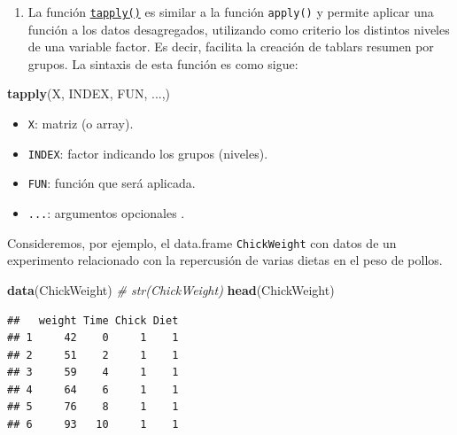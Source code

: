 \documentclass[
]{book}
\newenvironment{Shaded}{\begin{snugshade}}{\end{snugshade}}
\newcommand{\CommentTok}[1]{\textcolor[rgb]{0.56,0.35,0.01}{\textit{#1}}}
\newcommand{\FunctionTok}[1]{\textcolor[rgb]{0.13,0.29,0.53}{\textbf{#1}}}
\newcommand{\NormalTok}[1]{#1}
\newcommand{\OtherTok}[1]{\textcolor[rgb]{0.56,0.35,0.01}{#1}}
\newcommand{\SpecialCharTok}[1]{\textcolor[rgb]{0.81,0.36,0.00}{\textbf{#1}}}
\newcommand{\StringTok}[1]{\textcolor[rgb]{0.31,0.60,0.02}{#1}}
\providecommand{\tightlist}{%
  \setlength{\itemsep}{0pt}\setlength{\parskip}{0pt}}
\begin{document}
\begin{enumerate}
\def\labelenumi{\alph{enumi}.}
\setcounter{enumi}{2}
\tightlist
\item
  La función \href{https://www.rdocumentation.org/packages/base/versions/3.6.1/topics/tapply}{\texttt{tapply()}} es
  similar a la función \texttt{apply()} y permite aplicar una función a los datos desagregados,
  utilizando como criterio los distintos niveles de una variable factor. Es decir,
  facilita la creación de tablars resumen por grupos. La sintaxis de esta función es como sigue:
\end{enumerate}

\begin{Shaded}
\begin{Highlighting}[]
    \FunctionTok{tapply}\NormalTok{(X, INDEX, FUN, ...,)}
\end{Highlighting}
\end{Shaded}

\begin{itemize}
\tightlist
\item
  \texttt{X}: matriz (o array).
\item
  \texttt{INDEX}: factor indicando los grupos (niveles).
\item
  \texttt{FUN}: función que será aplicada.
\item
  \texttt{...}: argumentos opcionales .
\end{itemize}

Consideremos, por ejemplo, el data.frame \texttt{ChickWeight} con datos de un
experimento relacionado con la repercusión de varias dietas en el peso
de pollos.

\begin{Shaded}
\begin{Highlighting}[]
\FunctionTok{data}\NormalTok{(ChickWeight)}
\CommentTok{\# str(ChickWeight)}
\FunctionTok{head}\NormalTok{(ChickWeight)}
\end{Highlighting}
\end{Shaded}

\begin{verbatim}
##   weight Time Chick Diet
## 1     42    0     1    1
## 2     51    2     1    1
## 3     59    4     1    1
## 4     64    6     1    1
## 5     76    8     1    1
## 6     93   10     1    1
\end{verbatim}

\begin{Shaded}
\end{Shaded}
\end{document}
